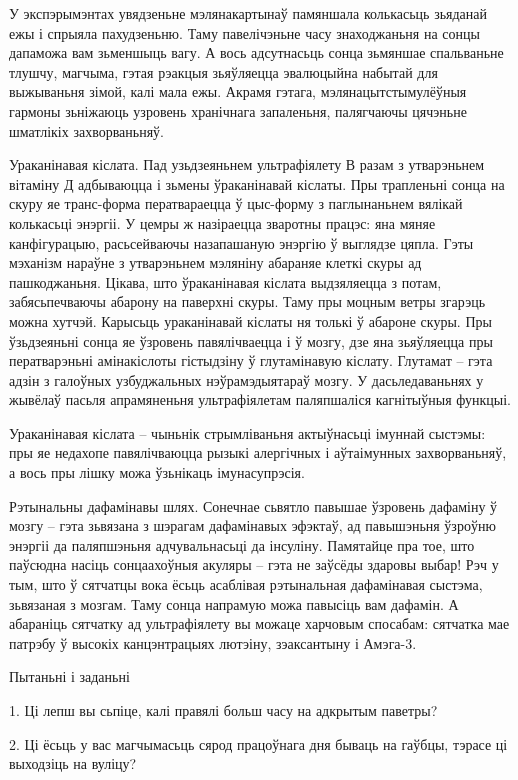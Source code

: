 У экспэрымэнтах увядзеньне мэлянакартынаў памяншала колькасьць зьяданай ежы і спрыяла пахудзеньню. Таму павелічэньне часу знаходжаньня на сонцы дапаможа вам зьменшыць вагу. А вось адсутнасьць сонца зьмяншае спальваньне тлушчу, магчыма, гэтая рэакцыя зьяўляецца эвалюцыйна набытай для выжываньня зімой, калі мала ежы. Акрамя гэтага, мэлянацытстымулёўныя гармоны зьніжаюць узровень хранічнага запаленьня, палягчаючы цячэньне шматлікіх захворваньняў. 

Ураканінавая кіслата. Пад узьдзеяньнем ультрафіялету В разам з утварэньнем вітаміну Д адбываюцца і зьмены ўраканінавай кіслаты. Пры трапленьні сонца на скуру яе транс-форма ператвараецца ў цыс-форму з паглынаньнем вялікай колькасьці энэргіі. У цемры ж назіраецца зваротны працэс: яна мяняе канфігурацыю, расьсейваючы назапашаную энэргію ў выглядзе цяпла. Гэты мэханізм нараўне з утварэньнем мэляніну абараняе клеткі скуры ад пашкоджаньня. Цікава, што ўраканінавая кіслата выдзяляецца з потам, забясьпечваючы абарону на паверхні скуры. Таму пры моцным ветры згарэць можна хутчэй. Карысьць ураканінавай кіслаты ня толькі ў абароне скуры. Пры ўзьдзеяньні сонца яе ўзровень павялічваецца і ў мозгу, дзе яна зьяўляецца пры ператварэньні амінакіслоты гістыдзіну ў глутамінавую кіслату. Глутамат – гэта адзін з галоўных узбуджальных нэўрамэдыятараў мозгу. У дасьледаваньнях у жывёлаў пасьля апрамяненьня ультрафіялетам паляпшаліся кагнітыўныя функцыі. 

Ураканінавая кіслата – чыньнік стрымліваньня актыўнасьці імуннай сыстэмы: пры яе недахопе павялічваюцца рызыкі алергічных і аўтаімунных захворваньняў, а вось пры лішку можа ўзьнікаць імунасупрэсія. 

Рэтынальны дафамінавы шлях. Сонечнае сьвятло павышае ўзровень дафаміну ў мозгу – гэта зьвязана з шэрагам дафамінавых эфэктаў, ад павышэньня ўзроўню энэргіі да паляпшэньня адчувальнасьці да інсуліну. Памятайце пра тое, што паўсюдна насіць сонцаахоўныя акуляры – гэта не заўсёды здаровы выбар! Рэч у тым, што ў сятчатцы вока ёсьць асаблівая рэтынальная дафамінавая сыстэма, зьвязаная з мозгам. Таму сонца напрамую можа павысіць вам дафамін. А абараніць сятчатку ад ультрафіялету вы можаце харчовым спосабам: сятчатка мае патрэбу ў высокіх канцэнтрацыях лютэіну, зэаксантыну і Амэга-3.

Пытаньні і заданьні

1. Ці лепш вы сьпіце, калі правялі больш часу на адкрытым паветры?

2. Ці ёсьць у вас магчымасьць сярод працоўнага дня бываць на гаўбцы, тэрасе ці выходзіць на вуліцу?

